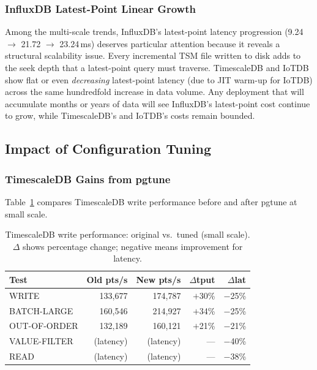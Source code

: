 \subsubsection{InfluxDB Latest-Point Linear Growth}

Among the multi-scale trends, InfluxDB's latest-point latency progression (9.24 $\to$
21.72 $\to$ 23.24\,ms) deserves particular attention because it reveals a structural
scalability issue. Every incremental TSM file written to disk adds to the seek depth
that a latest-point query must traverse. TimescaleDB and IoTDB show flat or even
\textit{decreasing} latest-point latency (due to JIT warm-up for IoTDB) across the
same hundredfold increase in data volume. Any deployment that will accumulate months or years of
data will see InfluxDB's latest-point cost continue to grow, while TimescaleDB's
and IoTDB's costs remain bounded.

\subsection{Impact of Configuration Tuning}
\label{sec:tuning-results}

\subsubsection{TimescaleDB Gains from pgtune}

Table~\ref{tab:tsdb-tuning} compares TimescaleDB write performance before and after
pgtune at small scale.

\begin{table}[t]
  \centering
  \caption{TimescaleDB write performance: original vs.\ tuned (small scale).
  $\Delta$ shows percentage change; negative means improvement for latency.}
  \label{tab:tsdb-tuning}
  \begin{tabular}{lrrrr}
    \hline
    \textbf{Test} & \textbf{Old pts/s} & \textbf{New pts/s} & $\Delta$tput & $\Delta$lat \\
    \hline
    WRITE        & 133{,}677 & 174{,}787 & $+$30\% & $-$25\% \\
    BATCH-LARGE  & 160{,}546 & 214{,}927 & $+$34\% & $-$25\% \\
    OUT-OF-ORDER & 132{,}189 & 160{,}121 & $+$21\% & $-$21\% \\
    VALUE-FILTER & (latency) & (latency) & ---     & $-$40\% \\
    READ         & (latency) & (latency) & ---     & $-$38\% \\
    \hline
  \end{tabular}
\end{table}

